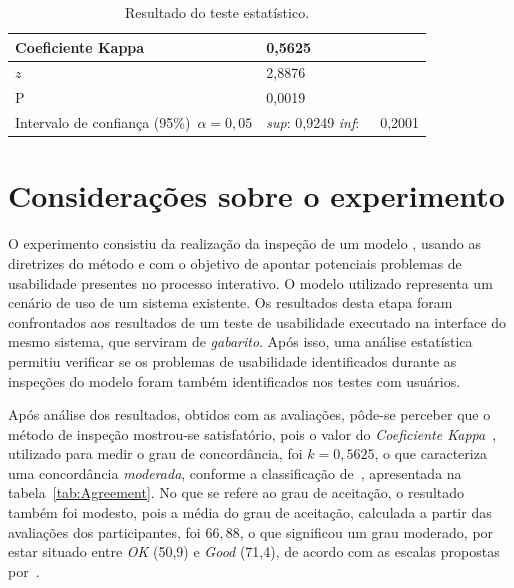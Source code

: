 \begin{table}[!htb]
  \begin{center}

    \begin{tabular}{|m{37mm}|m{20mm}|} \hline
      Coeficiente Kappa & 0,5625 \\ \hline
      $z$                 & 2,8876 \\ \hline
      P                   & 0,0019 \\ \hline
      Intervalo de confiança (95\%)~$\alpha=0,05$ & 
      {\em sup}: 0,9249 {\em inf}:~~~0,2001 \\ \hline
    \end{tabular}
    \caption{Resultado do teste estatístico.}
    \label{tab:Teste}
  \end{center}
\end{table}

\section{Considerações sobre o experimento}
\label{inspectionClosures}

O  experimento  consistiu  da  realização  da inspeção  de  um  modelo
\aladim, usando  as diretrizes do método  e com o  objetivo de apontar
potenciais problemas de  usabilidade presentes no processo interativo.
O  modelo  utilizado  representa  um  cenário de  uso  de  um  sistema
existente.    Os  resultados  desta   etapa  foram   confrontados  aos
resultados de um teste de  usabilidade executado na interface do mesmo
sistema,  que serviram  de  {\em gabarito}.   Após  isso, uma  análise
estatística  permitiu   verificar  se  os   problemas  de  usabilidade
identificados   durante   as   inspeções   do  modelo   foram   também
identificados nos testes com usuários.

Após  análise  dos  resultados,  obtidos com  as  avaliações,  pôde-se
perceber  que o  método de  inspeção mostrou-se  satisfatório,  pois o
valor  do {\em  Coeficiente  Kappa}~\cite{Cohen:1960}, utilizado  para
medir o  grau de concordância,  foi $k=0,5625$, o que  caracteriza uma
concordância     {\em    moderada},    conforme     a    classificação
de~,            apresentada            na
tabela~\ref{tab:Agreement}.  No que se  refere ao grau de aceitação, o
resultado  também foi  modesto, pois  a  média do  grau de  aceitação,
calculada a  partir das avaliações  dos participantes, foi  $66,88$, o
que  significou um  grau moderado,  por estar  situado entre  {\em OK}
(50,9)  e  {\em Good}  (71,4),  de  acordo  com as  escalas  propostas
por~.

